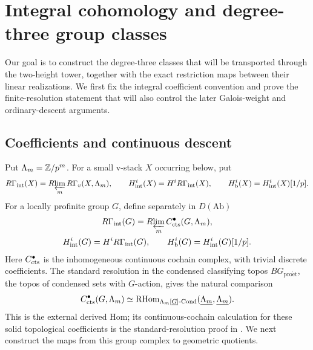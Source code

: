 \section{Integral cohomology and degree-three group classes}
\label{sec:cohomology}

Our goal is to construct the degree-three classes that will be transported
through the two-height tower, together with the exact restriction maps
between their linear realizations. We first fix the integral coefficient
convention and prove the finite-resolution statement that will also
control the later Galois-weight and ordinary-descent arguments.

\subsection{Coefficients and continuous descent}

Put $\Lambda_m=\mathbb Z/p^m$.  For a small v-stack $X$ occurring below, put
\[
 R\Gamma_{\mathrm{int}}(X)
   =R\!\varprojlim_m R\Gamma_v(X,\Lambda_m),\qquad
 H^i_{\mathrm{int}}(X)=H^iR\Gamma_{\mathrm{int}}(X),\qquad
 H^i_{\mathrm b}(X)=H^i_{\mathrm{int}}(X)[1/p].
\]
For a locally profinite group $G$, define separately in $D(\mathrm{Ab})$
\begin{equation}\label{eq:integral-group-cochains}
\begin{gathered}
 R\Gamma_{\mathrm{int}}(G)=R\!\varprojlim_m C_{\mathrm{cts}}^{\bullet}(G,\Lambda_m),
 \\
 H^i_{\mathrm{int}}(G)=H^iR\Gamma_{\mathrm{int}}(G),
 \qquad H^i_{\mathrm b}(G)=H^i_{\mathrm{int}}(G)[1/p].
\end{gathered}
\end{equation}
Here $C_{\mathrm{cts}}^{\bullet}$ is the inhomogeneous continuous cochain complex,
with trivial discrete coefficients.  The standard resolution in the
condensed classifying topos $BG_{\mathrm{pro\acute et}}$, the topos of
condensed sets with $G$-action, gives the natural comparison
\[
 C_{\mathrm{cts}}^{\bullet}(G,\Lambda_m)\simeq
 \operatorname{RHom}_{\Lambda_m[\underline G]\text{-}\mathrm{Cond}}
       (\underline{\Lambda_m},\underline{\Lambda_m}).
\]
This is the external derived Hom; its continuous-cochain calculation for
these solid topological coefficients is the standard-resolution proof in
\cite[\S2, pp.~5--7, Lemmas~2.1--2.2]{Anschutz2020}.
We next construct the maps from this group complex to geometric quotients.

